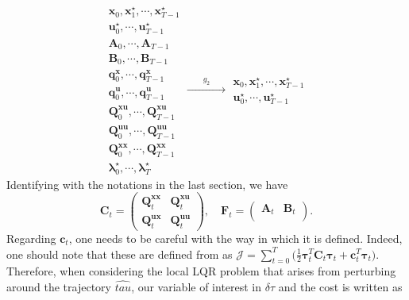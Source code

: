 \documentclass[a4paper,11pt]{article}
\renewcommand\b\bm
\begin{document}
\begin{equation}
    \begin{aligned}
        \b{x}_0, \b{x}^\star_1, \cdots, \b{x}^\star_{T-1} \\
        \b{u}^\star_0, \cdots, \b{u}^\star_{T-1}          \\
        \b{A}_{0}, \cdots, \b{A}_{T-1}                    \\
        \b{B}_{0}, \cdots, \b{B}_{T-1}                    \\
        \b{q}_{0}^{\b{x}}, \cdots, \b{q}_{T-1}^{\b{x}}    \\
        \b{q}_{0}^{\b{u}}, \cdots, \b{q}_{T-1}^{\b{u}}    \\
        \b{Q}_{0}^{\b{xu}}, \cdots, \b{Q}_{T-1}^{\b{xu}}  \\
        \b{Q}_{0}^{\b{uu}}, \cdots, \b{Q}_{T-1}^{\b{uu}}  \\
        \b{Q}_{0}^{\b{xx}}, \cdots, \b{Q}_{T-1}^{\b{xx}}  \\
        \b{\lambda}_0^\star, \cdots, \b{\lambda}_T^\star
    \end{aligned}
    \xrightarrow{\qquad g_2 \qquad}
    \begin{aligned}
        \b{x}_0, \b{x}^\star_1, \cdots, \b{x}^\star_{T-1} \\
        \b{u}^\star_0, \cdots, \b{u}^\star_{T-1}
    \end{aligned}
\end{equation}
%
Identifying with the notations in the last section, we have
%
\begin{equation}
    \b{C}_t =
    \begin{pmatrix}
        \b{Q}_t^{\b{xx}} & \b{Q}_t^{\b{xu}} \\
        \b{Q}_t^{\b{ux}} & \b{Q}_t^{\b{uu}}
    \end{pmatrix},
    \quad
    \b{F}_t =
    \begin{pmatrix}
        \b{A}_t & \b{B}_t \\
    \end{pmatrix}.
\end{equation}
%
Regarding $\b{c}_t$, one needs to be careful with the way in which it is defined. Indeed, one should note that these are defined from 
as $ \mathcal{J} = \sum_{t=0}^{T} \big (\frac{1}{2} \bm{\tau}_t^T \b{C}_t \bm{\tau}_t + \b{c}_t^T \b{\tau}_t \big )$. Therefore, when considering the local LQR problem that arises from perturbing around the trajectory $\hat{tau}$, our variable of interest in $\delta\tau$ and the cost is written as 
\end{document}
